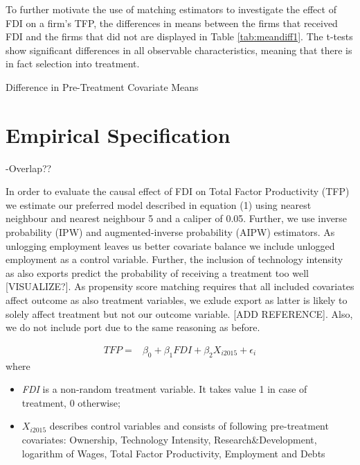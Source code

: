 \documentclass[a4paper,11pt]{scrartcl}
\begin{document}
To further motivate the use of matching estimators to investigate the effect of FDI on a firm's TFP, the differences in means between the firms that received FDI and the firms that did not are displayed in Table \ref{tab:meandiff1}. The t-tests show significant differences in all observable characteristics, meaning that there is in fact selection into treatment. 

\begin{table}[hbtp!]
	\centering
	\caption{Difference in Pre-Treatment Covariate Means}
	
	\label{tab:meandiff1}
\end{table}


\section{Empirical Specification}

-Overlap?? 

In order to evaluate the causal effect of FDI on Total Factor Productivity (TFP) we estimate our preferred model described in equation (1) using nearest neighbour and nearest neighbour 5 and a caliper of 0.05. Further, we use  inverse probability (IPW) and augmented-inverse probability (AIPW) estimators.
As unlogging employment leaves us better covariate balance we include unlogged employment as a control variable. Further, the inclusion of technology intensity as also exports predict the probability of receiving a treatment too well  [VISUALIZE?]. As propensity score matching requires that all included covariates affect outcome as also treatment variables, we exlude export as latter is likely to solely affect treatment but not our outcome variable. [ADD REFERENCE]. Also, we do not include port due to the same reasoning as before. 

\begin{align*}
TFP  =&  \beta_{0} + \beta_{1} FDI + \beta_{2} X_{i 2015} + \epsilon_{i}   
\end{align*}
where
\begin{itemize}
\item \textit{FDI} is a non-random treatment variable. It takes value 1 in case of treatment, 0 otherwise;
\item  $X_{i 2015}$ describes control variables and consists of following pre-treatment covariates: Ownership, Technology Intensity, Research\&Development, logarithm of Wages, Total Factor Productivity, Employment and Debts
\end{itemize}
\end{document}
